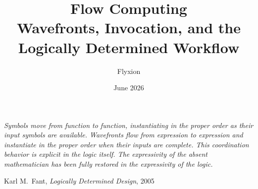 \documentclass[12pt, a4paper]{article}
\title{\textbf{Flow Computing}\\[0.4em]
  \large Wavefronts, Invocation, and the Logically Determined Workflow}
\author{Flyxion}
\date{June 2026}
\begin{document}

\maketitle
\thispagestyle{empty}

\epigraph{%
  \itshape
  Symbols move from function to function, instantiating in the proper
  order as their input symbols are available. Wavefronts flow from
  expression to expression and instantiate in the proper order when their
  inputs are complete. This coordination behavior is explicit in the
  logic itself. The expressivity of the absent mathematician has been
  fully restored in the expressivity of the logic.%
}{Karl M.\ Fant, \textit{Logically Determined Design}, 2005}

\vspace{1.2em}
\end{document}
